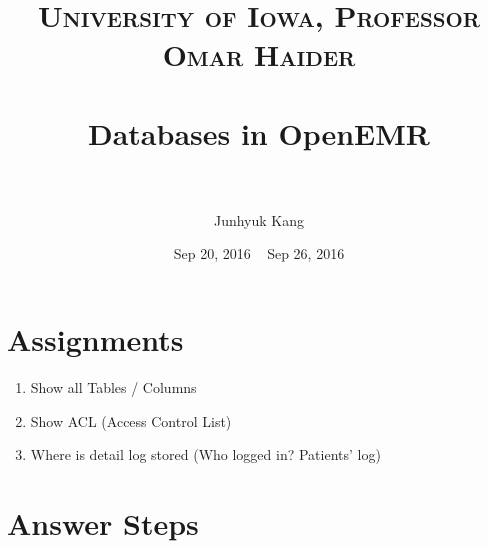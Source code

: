 \documentclass[paper=a4, fontsize=11pt]{scrartcl} %
\title{	
\normalfont \normalsize 
\textsc{University of Iowa, Professor Omar Haider} \\ [25pt] %
\horrule{0.5pt} \\[0.4cm] %
\huge Databases in OpenEMR \\ %
\horrule{2pt} \\[0.5cm] %
}
\author{Junhyuk Kang} %
\date{Sep 20, 2016 ~ Sep 26, 2016 } %
\numberwithin{equation}{section} %
\numberwithin{figure}{section} %
\numberwithin{table}{section} %
\begin{document}
\maketitle %

\section{Assignments}
\begin{enumerate}
  \item Show all Tables / Columns
  \item Show ACL (Access Control List)
  \item Where is detail log stored (Who logged in? Patients' log)
\end{enumerate}

\section{Answer Steps}
\end{document}
